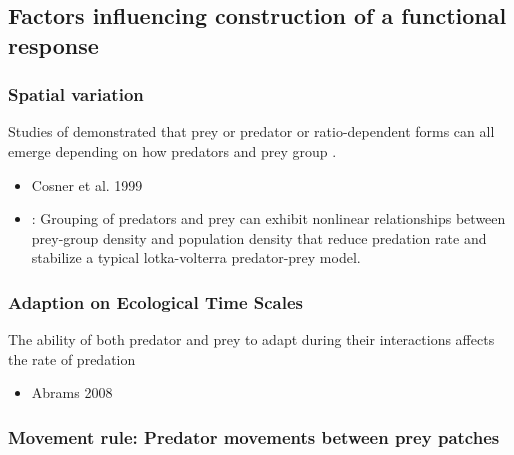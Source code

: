 \documentclass[12pt, a4paper]{article}
\begin{document}
\subsection{Factors influencing construction of a functional response}
\subsubsection{Spatial variation}
 Studies of demonstrated that prey or predator or ratio-dependent forms can all emerge depending on how predators and prey group \citep{Anderson2010}.
\begin{itemize}
\item Cosner et al. 1999
\item \cite{Fryxelletal2007}: Grouping of predators and prey can exhibit nonlinear relationships between prey-group density and population density that reduce predation rate and stabilize a typical lotka-volterra predator-prey model. 
\end{itemize}

\subsubsection{Adaption on Ecological Time Scales}
The ability of both predator and prey to adapt during their interactions affects the rate of predation \citep{Anderson2010}
\begin{itemize}
\item Abrams 2008
\end{itemize}


\subsubsection{Movement rule: Predator movements between prey patches}
\end{document}
